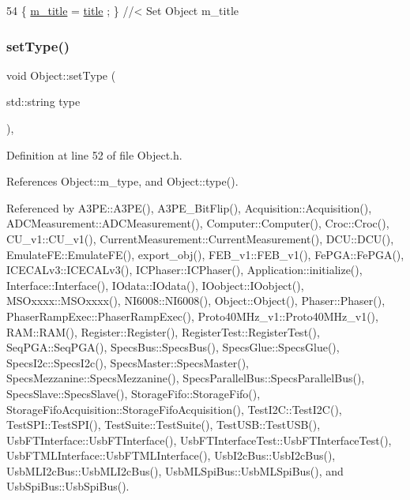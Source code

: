 \begin{DoxyCode}
54 \{ \hyperlink{classObject_affbeea1953eb5163573b92fad8f75727}{m\_title} = \hyperlink{classObject_a73a0f1a41828fdd8303dd662446fb6c3}{title} ; \} \textcolor{comment}{//< Set Object m\_title}
\end{DoxyCode}
\mbox{\label{classObject_aae534cc9d982bcb9b99fd505f2e103a5}} 
\subsubsection{\texorpdfstring{set\+Type()}{setType()}}
{\footnotesize\ttfamily void Object\+::set\+Type (\begin{DoxyParamCaption}\item[{std\+::string}]{type }\end{DoxyParamCaption})\hspace{0.3cm}{\ttfamily [inline]}, {\ttfamily [inherited]}}



Definition at line 52 of file Object.\+h.



References Object\+::m\+\_\+type, and Object\+::type().



Referenced by A3\+P\+E\+::\+A3\+P\+E(), A3\+P\+E\+\_\+\+Bit\+Flip(), Acquisition\+::\+Acquisition(), A\+D\+C\+Measurement\+::\+A\+D\+C\+Measurement(), Computer\+::\+Computer(), Croc\+::\+Croc(), C\+U\+\_\+v1\+::\+C\+U\+\_\+v1(), Current\+Measurement\+::\+Current\+Measurement(), D\+C\+U\+::\+D\+C\+U(), Emulate\+F\+E\+::\+Emulate\+F\+E(), export\+\_\+obj(), F\+E\+B\+\_\+v1\+::\+F\+E\+B\+\_\+v1(), Fe\+P\+G\+A\+::\+Fe\+P\+G\+A(), I\+C\+E\+C\+A\+Lv3\+::\+I\+C\+E\+C\+A\+Lv3(), I\+C\+Phaser\+::\+I\+C\+Phaser(), Application\+::initialize(), Interface\+::\+Interface(), I\+Odata\+::\+I\+Odata(), I\+Oobject\+::\+I\+Oobject(), M\+S\+Oxxxx\+::\+M\+S\+Oxxxx(), N\+I6008\+::\+N\+I6008(), Object\+::\+Object(), Phaser\+::\+Phaser(), Phaser\+Ramp\+Exec\+::\+Phaser\+Ramp\+Exec(), Proto40\+M\+Hz\+\_\+v1\+::\+Proto40\+M\+Hz\+\_\+v1(), R\+A\+M\+::\+R\+A\+M(), Register\+::\+Register(), Register\+Test\+::\+Register\+Test(), Seq\+P\+G\+A\+::\+Seq\+P\+G\+A(), Specs\+Bus\+::\+Specs\+Bus(), Specs\+Glue\+::\+Specs\+Glue(), Specs\+I2c\+::\+Specs\+I2c(), Specs\+Master\+::\+Specs\+Master(), Specs\+Mezzanine\+::\+Specs\+Mezzanine(), Specs\+Parallel\+Bus\+::\+Specs\+Parallel\+Bus(), Specs\+Slave\+::\+Specs\+Slave(), Storage\+Fifo\+::\+Storage\+Fifo(), Storage\+Fifo\+Acquisition\+::\+Storage\+Fifo\+Acquisition(), Test\+I2\+C\+::\+Test\+I2\+C(), Test\+S\+P\+I\+::\+Test\+S\+P\+I(), Test\+Suite\+::\+Test\+Suite(), Test\+U\+S\+B\+::\+Test\+U\+S\+B(), Usb\+F\+T\+Interface\+::\+Usb\+F\+T\+Interface(), Usb\+F\+T\+Interface\+Test\+::\+Usb\+F\+T\+Interface\+Test(), Usb\+F\+T\+M\+L\+Interface\+::\+Usb\+F\+T\+M\+L\+Interface(), Usb\+I2c\+Bus\+::\+Usb\+I2c\+Bus(), Usb\+M\+L\+I2c\+Bus\+::\+Usb\+M\+L\+I2c\+Bus(), Usb\+M\+L\+Spi\+Bus\+::\+Usb\+M\+L\+Spi\+Bus(), and Usb\+Spi\+Bus\+::\+Usb\+Spi\+Bus().



